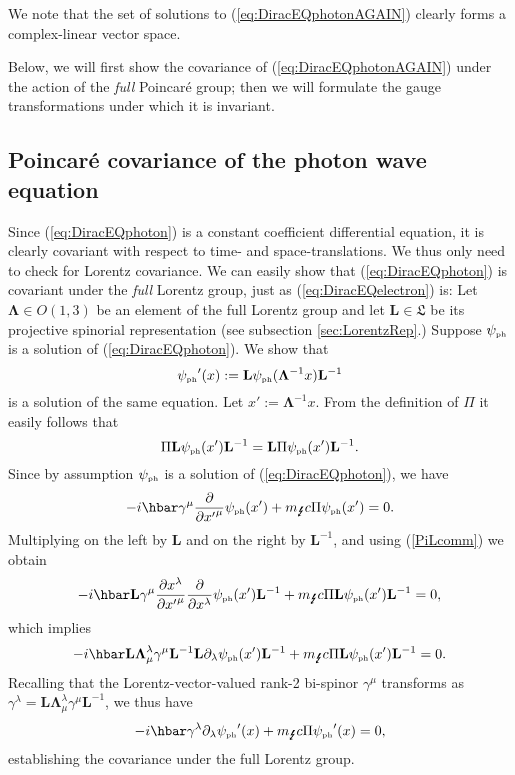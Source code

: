 \documentclass[12pt]{article}
\theoremstyle{definition}
\newcommand{\refeq}[1]{(\ref{#1})}
\numberwithin{equation}{section}
\newcommand{\bL}{\mathbf{L}}
\newcommand{\beq}{\begin{equation}}
\newcommand{\eeq}{\end{equation}}
\newcommand{\fL}{\mathfrak{L}}
\newcommand{\p}{\partial}
\newcommand{\bLa}{\boldsymbol{\Lambda}}
\newcommand{\psiPH}{{\psi_{\mbox{\rm\tiny ph}}}}
\newcommand{\mPH}{{m_{\mbox{\Lightning}}}}
\newcommand{\la}{\lambda}
\newcommand{\ga}{\gamma}
\begin{document}
 We note that the set of solutions to \refeq{eq:DiracEQphotonAGAIN} clearly forms a complex-linear vector space. 

Below, we will first show the covariance of \refeq{eq:DiracEQphotonAGAIN} under the action of the {\em full} Poincar\'e group; 
then we will formulate the gauge transformations under which it is invariant.

\subsection{Poincar\'e covariance of the photon wave equation}\label{sec:lorentzcov}
%

%
Since \refeq{eq:DiracEQphoton} is a constant coefficient differential equation, it is clearly covariant with respect to time- and space-translations.  We thus only need to check for Lorentz covariance.   We can easily show that  (\ref{eq:DiracEQphoton}) is covariant 
under the {\em full} Lorentz group, just as (\ref{eq:DiracEQelectron}) is:
 Let $\bLa \in O(1,3)$ be an element of the full Lorentz group and let $\bL \in \fL$ be its projective spinorial representation (see subsection \ref{sec:LorentzRep}.)
 Suppose $\psiPH$ is a solution of \refeq{eq:DiracEQphoton}.
 We show that
\beq 
\psiPH'(x) := \bL \psiPH( \bLa^{-1} x) \bL^{-1}
\eeq
is a solution of the same equation.  Let $x' := \bLa^{-1} x$.  
 From the definition of $\Pi$ it easily follows that
\beq 
\label{PiLcomm} 
\Pi \bL \psiPH(x')  \bL^{-1} = \bL \Pi \psiPH(x') \bL^{-1}.
\eeq
Since by assumption $\psiPH$ is a solution of (\ref{eq:DiracEQphoton}), we have
\beq 
 -i \hbar \ga^\mu \frac{\p}{\p {x'}^\mu} \psiPH(x') + \mPH c\Pi \psiPH(x') = 0.
\eeq
Multiplying on the left by $\bL$ and on the right by $\bL^{-1}$, and using \refeq{PiLcomm} we obtain
\beq 
-i\hbar \bL \ga^\mu \frac{\p x^\la}{\p {x'}^\mu} \frac{\p}{\p x^\la} \psiPH(x') \bL^{-1} + \mPH c \Pi \bL\psiPH(x')\bL^{-1} = 0,
\eeq
which implies
\beq 
-i \hbar \bL \bLa^\la_\mu \ga^\mu \bL^{-1}\bL \p_\la \psiPH(x') \bL^{-1} + \mPH c \Pi \bL\psiPH(x')\bL^{-1} = 0.
\eeq
Recalling that the Lorentz-vector-valued rank-2 bi-spinor $\ga^\mu$ transforms as $\ga^\la = \bL \bLa^\la_\mu \ga^\mu \bL^{-1}$, we thus have
\beq 
-i \hbar \ga^\la \p_\la \psiPH'(x) + \mPH c \Pi \psiPH'(x) = 0,
\eeq
establishing the covariance under the full Lorentz group.
%
\end{document}
